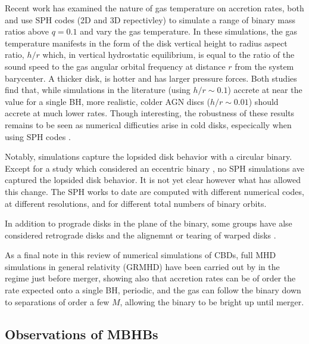 Recent work has examined the nature of gas temperature on accretion rates,
both \cite{YoungClarke:2015} and \cite{RagusaLodato:2016} use SPH codes (2D
and 3D repectivley) to simulate a range of binary mass ratios above $q=0.1$
and vary the gas temperature. In these simulations, the gas temperature
manifests in the form of the disk vertical height to radius aspect ratio,
$h/r$ which, in vertical hydrostatic equilibrium, is equal to the ratio of the
sound speed to the gas angular orbital frequency at distance $r$ from the
system barycenter. A thicker disk, is hotter and has larger pressure forces.
Both studies find that, while simulations in the literature (using $h/r \sim
0.1$) accrete at near the value for a single BH, more realistic, colder AGN
discs ($h/r \sim 0.01$) should accrete at much lower rates. Though
interesting, the robustness of these results remains to be seen as numerical
difficuties arise in cold disks, especically when using SPH codes \citep{}.


Notably, \citep{RagusaLodato:2016} simulations capture the lopsided disk
behavior with a circular binary. Except for a study which considered an
eccentric binary \citep{Dunhill:2012}, no SPH simulations ave captured the
lopsided disk behavior. It is not yet clear however what has allowed this
change. The SPH works to date are computed with different numerical codes, at
different resolutions, and for different total numbers of binary orbits.


In addition to prograde disks in the plane of the binary, some groups have alse considered retrograde disks \citep{Nixon+2011, ReodigSesana:2014, BankertShiKrolik:2015, Amaro-Seoane+2016} and the alignemnt or tearing of warped disks \citep{Nixon+2012, Hayasaki+2013, Nixon+2013, DoganNixonKingPrice:2015
}.

As a final note in this review of numerical simulations of CBDs, full MHD
simulations in general relativity (GRMHD) have been carried out by
\cite{Farris:2010, Farris:2011, Farris:2012, Gold:2014a, Gold:2014b} in the
regime just before merger, showing also that accretion rates can be of order
the rate expected onto a single BH, periodic, and the gas can follow the
binary down to separations of order a few $M$, allowing the binary to be
bright up until merger.






\subsection{Observations of MBHBs}

